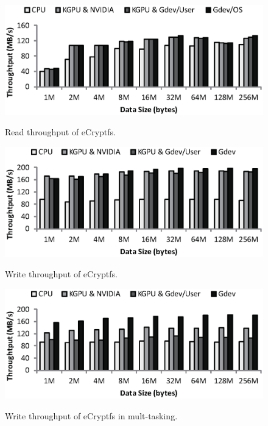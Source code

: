 \begin{figure}[t]
 \begin{center}
  \includegraphics[width=0.9\hsize]{eps/ecryptfs_read.eps}\\
  \vspace{-1.5em}
  \caption{Read throughput of eCryptfs.}
  \label{fig:ecryptfs_read}
 \end{center}
 \vspace{-1.5em}
 \begin{center}
  \includegraphics[width=0.9\hsize]{eps/ecryptfs_write.eps}\\
  \vspace{-1.5em}
  \caption{Write throughput of eCryptfs.}
  \label{fig:ecryptfs_write}
 \end{center}
 \vspace{-1.5em}
 \begin{center}
  \includegraphics[width=0.9\hsize]{eps/ecryptfs_write_multitask.eps}\\
  \vspace{-1.5em}
  \caption{Write throughput of eCryptfs in mult-tasking.}
  \label{fig:ecryptfs_write_multitask}
 \end{center}
 \vspace{-1.5em}
\end{figure}

